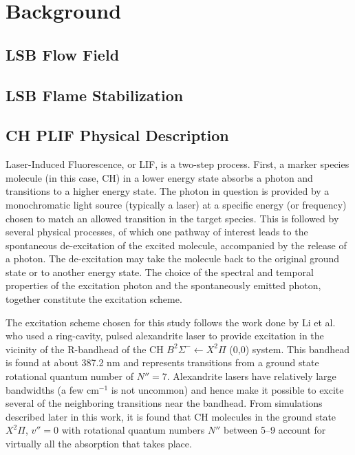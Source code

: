 \chapter{Background}
\label{ch:background}




\section{LSB Flow Field}

\section{LSB Flame Stabilization}

\section{CH PLIF Physical Description}
\label{sec:background-ch-plif-physical-description}

Laser-Induced Fluorescence, or LIF, is a two-step process.
First, a marker species molecule (in this case, CH) in a lower energy state absorbs a photon and transitions to a higher energy state.
The photon in question is provided by a monochromatic light source (typically a laser) at a specific energy (or frequency) chosen to match an allowed transition in the target species.
This is followed by several physical processes, of which one pathway of interest leads to the spontaneous de-excitation of the excited molecule, accompanied by the release of a photon.
The de-excitation may take the molecule back to the original ground state or to another energy state.
The choice of the spectral and temporal properties of the excitation photon and the spontaneously emitted photon, together constitute the excitation scheme.

The excitation scheme chosen for this study follows the work done by Li et al.\cite{2007-li-a} who used a ring-cavity, pulsed alexandrite laser to provide excitation in the vicinity of the R-bandhead of the CH \(B^2\Sigma^- \leftarrow X^2\Pi\) (0,0) system.
This bandhead is found at about 387.2 nm and represents transitions from a ground state rotational quantum number of \(N''=7\).
Alexandrite lasers have relatively large bandwidths (a few cm\(^{-1}\) is not uncommon) and hence make it possible to excite several of the neighboring transitions near the bandhead.
From simulations described later in this work, it is found that CH molecules in the ground state \(X^2\Pi\), \(v''=0\) with rotational quantum numbers \(N''\) between 5--9 account for virtually all the absorption that takes place.


